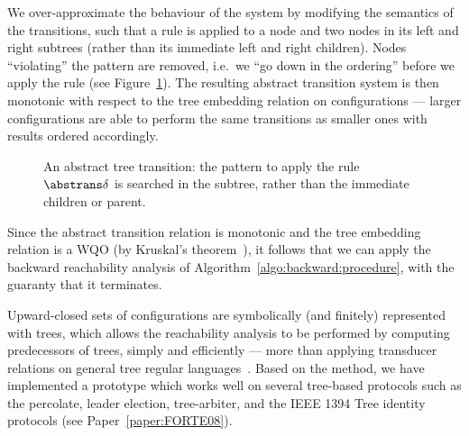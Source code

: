 We over-approximate the behaviour of the system by modifying the
semantics of the transitions, such that a rule is applied to
a node and two nodes in its left and right subtrees (rather than its
immediate left and right children).
%
Nodes ``violating'' the pattern are removed, i.e.\ we ``go down in the
ordering'' before we apply the rule (see
Figure~\ref{figure:tree:transition:abstract}).
%
The resulting abstract transition system is then monotonic with
respect to the tree embedding relation on configurations --- larger
configurations are able to perform the same transitions as smaller
ones with results ordered accordingly.
%

\begingroup%
\setlength\intextsep{\dazintextsep}
\begin{figure}[hb]
  \centering
  \caption{An abstract tree transition: the pattern to apply the
    rule~$\abstrans\delta$ is searched in the subtree, rather than the
    immediate children or parent.}
  \label{figure:tree:transition:abstract}
\end{figure}
\endgroup

Since the abstract transition relation is monotonic and the tree
embedding relation is a WQO (by Kruskal's theorem~\cite{kruskal}), it
follows that we can apply the backward reachability analysis of
Algorithm~\ref{algo:backward:procedure}, with the guaranty that it
terminates.

Upward-closed sets of configurations are symbolically (and finitely)
represented with trees, which allows the reachability analysis to be
performed by computing predecessors of trees, simply and efficiently
--- more than applying transducer relations on general tree regular
languages~\cite{rmc:wo:transducers}.
%
Based on the method, we have implemented a prototype which works well
on several tree-based protocols such as the percolate, leader
election, tree-arbiter, and the IEEE 1394 Tree identity protocols (see
Paper~\ref{paper:FORTE08}).
